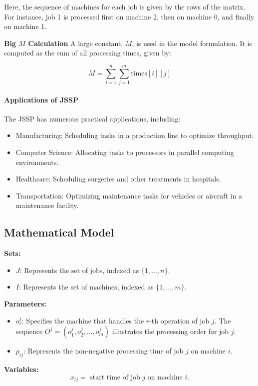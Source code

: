 {Here, the sequence of machines for each job is given by the rows of the matrix. For instance, job 1 is processed first on machine 2, then on machine 0, and finally on machine 1.

\textbf{Big \(M\) Calculation}
A large constant, \( M \), is used in the model formulation. It is computed as the sum of all processing times, given by:

\[
M = \sum_{i=1}^{n} \sum_{j=1}^{m} \text{times}[i][j]
\]

\begin{figure}
\end{figure}



\paragraph{Applications of JSSP}
The JSSP has numerous practical applications, including:
\begin{itemize}
  \item Manufacturing: Scheduling tasks in a production line to optimize throughput.
  \item Computer Science: Allocating tasks to processors in parallel computing environments.
  \item Healthcare: Scheduling surgeries and other treatments in hospitals.
  \item Transportation: Optimizing maintenance tasks for vehicles or aircraft in a maintenance facility.
\end{itemize}


\subsection{Mathematical Model}


\noindent \textbf{Sets:}
\begin{itemize}
  \item \( J\): Represents the set of jobs, indexed as \( \{1, \ldots, n\} \).
  \item \( I \): Represents the set of machines, indexed as \( \{1, \ldots, m\} \).
  \end{itemize}
\noindent \textbf{Parameters:}
\begin{itemize}
 \item \( o_r^j \): Specifies the machine that handles the \( r \)-th operation of job \( j \). The sequence \( O^j=\left(o_1^j, o_2^j, \ldots, o_m^j\right) \) illustrates the processing order for job \( j \).
  \item \( p_{i j} \): Represents the non-negative processing time of job \( j \) on machine \( i \).
\end{itemize}
\noindent \textbf{Variables:}
$$
x_{ij} = \text{ start time of job $j$ on machine $i$}.
$$

}
